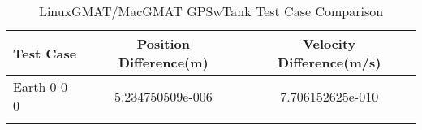 \begin{table}[htbp!]
\centering
\caption{ LinuxGMAT/MacGMAT GPSwTank Test Case Comparison}
      \begin{tabular}{lcc}
      \hline\hline
          Test Case & Position Difference(m) & Velocity Difference(m/s) \\
         \hline
         Earth-0-0-0 & 5.234750509e-006 & 7.706152625e-010 \\
      \hline\hline
      \label{Table: GPSwTank LinuxGMAT-MacGMAT Table} 
\end{tabular}
\end{table}
